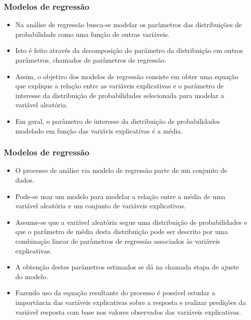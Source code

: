 \documentclass[handout,serif, professionalfont, usenames, dvipsnames, aspectratio = 169]{beamer}\usepackage[]{graphicx}\usepackage[]{color}
\begin{document}

\begin{frame}
  \frametitle{Modelos de regressão}

  \begin{itemize}
    \itemsep 2ex

  \item Na análise de regressão busca-se modelar os parâmetros das distribuições de probabilidade como uma função de outras variáveis.
  
  \item Isto é feito através da decomposição do parâmetro da distribuição em outros parâmetros, chamados de parâmetros de regressão. 
  
  \item Assim, o objetivo dos modelos de regressão consiste em obter uma equação que explique a relação entre as variáveis explicativas e o parâmetro de interesse da distribuição de probabilidades selecionada para modelar a variável aleatória. 
  
  \item Em geral, o parâmetro de interesse da distribuição de probabilidades modelado em função das variávis explicativas é a média. 
  
  \end{itemize}
\end{frame}


\begin{frame}
  \frametitle{Modelos de regressão}

  \begin{itemize}
    \itemsep 2ex

  \item O processo de análise via modelo de regressão parte de um conjunto de dados.
  
  \item Pode-se usar um modelo para modelar a relação entre a média de uma variável aleatória e um conjunto de variáveis explicativas. 
  
  \item Assume-se que a variável aleatória segue uma distribuição de probabilidades e que o parâmetro de média desta distribuição pode ser descrito por uma combinação linear de parâmetros de regressão associados às variáveis explicativas. 
  
  \item A obtenção destes parâmetros estimados se dá na chamada etapa de ajuste do modelo.
  
  \item Fazendo uso da equação resultante do processo é possível estudar a importância das variáveis explicativas sobre a resposta e realizar predições da variável resposta com base nos valores observados das variáveis explicativas. 
  
  \end{itemize}
\end{frame}
\end{document}
